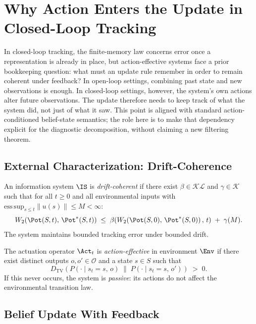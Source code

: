 \section{Why Action Enters the Update in Closed-Loop Tracking}\label{sec:necessity}

In closed-loop tracking, the finite-memory law concerns error once a
representation is already in place, but action-effective systems face a prior
bookkeeping question: what must an update rule remember in order to remain
coherent under feedback? In open-loop settings, combining past state and new
observations is enough. In closed-loop settings, however, the system's own
actions alter future observations. The update therefore needs to keep track of
what the system did, not just of what it saw. This point is aligned with
standard action-conditioned belief-state semantics; the role here is to make
that dependency explicit for the diagnostic decomposition, without claiming a
new filtering theorem.

\subsection{External Characterization: Drift-Coherence}

\begin{definition}\label{def:driftcoherent}
An information system $\IS$ is \emph{drift-coherent} if there exist
$\beta \in \mathcal{KL}$ and $\gamma \in \mathcal{K}$ such that for all
$t \geq 0$ and all environmental inputs with
$\mathrm{ess\,sup}_{s \leq t}\|u(s)\| \leq M < \infty$:
\[
  W_2\!\left(\Pot(S,t),\,\Pot^*(S,t)\right)
  \;\leq\;
  \beta\!\left(W_2\!\left(\Pot(S,0),\,\Pot^*(S,0)\right),\,t\right)
  \;+\;
  \gamma(M).
\]
The system maintains bounded tracking error under bounded drift.
\end{definition}

\begin{definition}\label{def:actioneffective}
The actuation operator $\Act_t$ is \emph{action-effective} in environment
$\Env$ if there exist distinct outputs $o, o' \in \mathcal{O}$ and a state
$s \in S$ such that
\[
  D_{\mathrm{TV}}\!\left(P(\cdot \mid s_t = s,\, o)
  \;\Big\|\;
  P(\cdot \mid s_t = s,\, o')\right) \;>\; 0.
\]
If this never occurs, the system is \emph{passive}: its actions do not affect
the environmental transition law.
\end{definition}

\subsection{Belief Update With Feedback}

